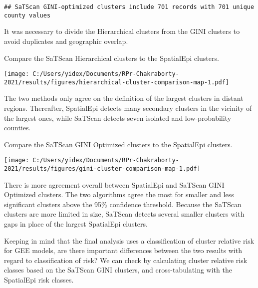 \documentclass[
]{article}
\begin{document}
\begin{verbatim}
## SaTScan GINI-optimized clusters include 701 records with 701 unique county values
\end{verbatim}

It was necessary to divide the Hierarchical clusters from the GINI
clusters to avoid duplicates and geographic overlap.

Compare the SaTScan Hierarchical clusters to the SpatialEpi clusters.

\texttt{[image: C:/Users/yidex/Documents/RPr-Chakraborty-2021/results/figures/hierarchical-cluster-comparison-map-1.pdf]}

The two methods only agree on the definition of the largest clusters in
distant regions. Thereafter, SpatialEpi detects many secondary clusters
in the vicinity of the largest ones, while SaTScan detects seven
isolated and low-probability counties.

Compare the SaTScan GINI Optimized clusters to the SpatialEpi clusters.

\texttt{[image: C:/Users/yidex/Documents/RPr-Chakraborty-2021/results/figures/gini-cluster-comparison-map-1.pdf]}

There is more agreement overall between SpatialEpi and SaTScan GINI
Optimized clusters. The two algorithms agree the most for smaller and
less significant clusters above the 95\% confidence threshold. Because
the SaTScan clusters are more limited in size, SaTScan detects several
smaller clusters with gaps in place of the largest SpatialEpi clusters.

Keeping in mind that the final analysis uses a classification of cluster
relative risk for GEE models, are there important differences between
the two results with regard to classification of risk? We can check by
calculating cluster relative risk classes based on the SaTScan GINI
clusters, and cross-tabulating with the SpatialEpi risk classes.
\end{document}
